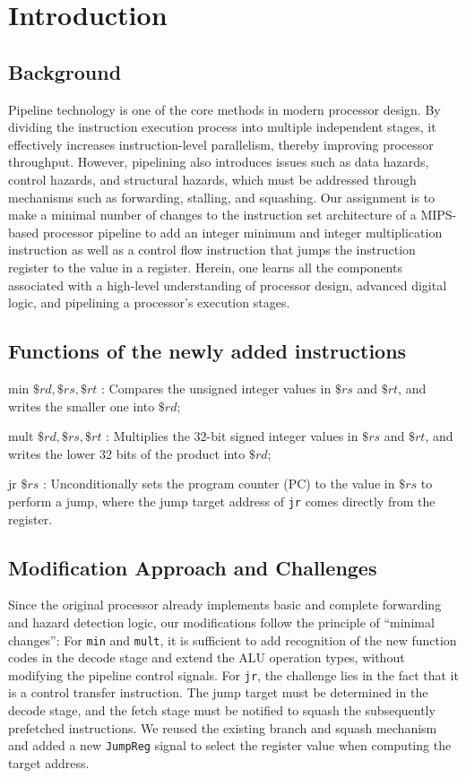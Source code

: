 \documentclass[conference]{IEEEtran}
\begin{document}
\section{Introduction}

\subsection{Background}
Pipeline technology is one of the core methods in modern processor design. By dividing the instruction execution process into multiple independent stages, it effectively increases instruction-level parallelism, thereby improving processor throughput. However, pipelining also introduces issues such as data hazards, control hazards, and structural hazards, which must be addressed through mechanisms such as forwarding, stalling, and squashing.
Our assignment is to make a minimal number of changes to the
instruction set architecture of a MIPS-based processor pipeline to add an
integer minimum and integer multiplication instruction as well as a control
flow instruction that jumps the instruction register to the value in a
register. Herein, one learns all the components associated with a high-level understanding of processor design, advanced digital logic, and pipelining a processor's
execution stages.

\subsection{Functions of the newly added instructions}
min $\$rd, \$rs, \$rt$ : Compares the unsigned integer values in $\$rs$ and $\$rt$, and writes the smaller one into $\$rd$;

mult $\$rd, \$rs, \$rt$ : Multiplies the 32-bit signed integer values in $\$rs$ and $\$rt$, and writes the lower 32 bits of the product into $\$rd$;

jr $\$rs$ : Unconditionally sets the program counter (PC) to the value in $\$rs$ to perform a jump, where the jump target address of \texttt{jr} comes directly from the register.

\subsection{Modification Approach and Challenges}
Since the original processor already implements basic and complete forwarding and hazard detection logic, our modifications follow the principle of ``minimal changes'':
For \texttt{min} and \texttt{mult}, it is sufficient to add recognition of the new function codes in the decode stage and extend the ALU operation types, without modifying the pipeline control signals.
For \texttt{jr}, the challenge lies in the fact that it is a control transfer instruction. The jump target must be determined in the decode stage, and the fetch stage must be notified to squash the subsequently prefetched instructions. We reused the existing branch and squash mechanism and added a new \texttt{JumpReg} signal to select the register value when computing the target address.
\end{document}
